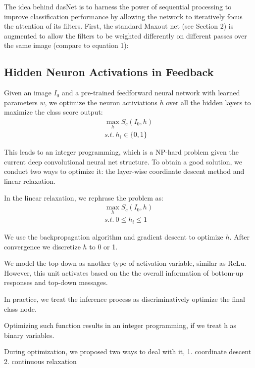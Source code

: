 The idea behind dasNet is to harness the power of sequential processing to improve classification performance by allowing the network to iteratively focus the attention of its filters. First, the standard Maxout net (see Section 2) is augmented to allow the filters to be weighted differently on different passes over the same image (compare to equation 1):

\subsection{Hidden Neuron Activations in Feedback}
Given an image $I_0$ and a pre-trained feedforward neural network with learned parameters $w$, we optimize the neuron activiations $h$ over all the hidden layers to maximize the class score output:
\begin{equation}
\begin{aligned}
  \max_h S_c(I_0, h) \\
  s.t.\ h_i \in \{0, 1\}
\end{aligned}
\end{equation}

This leads to an integer programming, which is a NP-hard problem given the current deep convolutional neural net structure. To obtain a good solution, we conduct two ways to optimize it: the layer-wise coordinate descent method and linear relaxation.

In the linear relaxation, we rephrase the problem as:
\begin{equation}
\begin{aligned}
  \max_h S_c(I_0, h) \\
  s.t.\ 0 \leq h_i \leq 1
\end{aligned}
\end{equation}

We use the backpropagation algorithm and gradient descent to optimize $h$. After convergence we discretize $h$ to 0 or 1.

We model the top down as another type of activation variable, similar as ReLu. However, this unit activates based on the the overall information of bottom-up responses and top-down messages. 

In practice, we treat the inference process as discriminatively optimize the final class node. 

Optimizing such function results in an integer programming, if we treat h as binary variables. 

During optimization, we proposed two ways to deal with it, 1. coordinate descent 2. continuous relaxation


